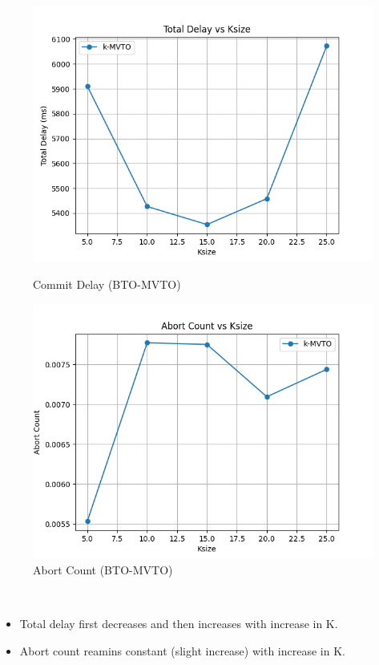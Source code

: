 \documentclass[12pt]{article}
\begin{document}
\begin{figure}[h]
    \centering
    \begin{minipage}[b]{0.45\textwidth}
        \includegraphics[width=\textwidth]{./images/KsizeTD.png}
        \caption{Commit Delay (BTO-MVTO)}
        \label{fig:KsizeTD}
    \end{minipage}
    \hfill
    \begin{minipage}[b]{0.45\textwidth}
        \includegraphics[width=\textwidth]{./images/KsizeAC.png}
        \caption{Abort Count (BTO-MVTO)}
        \label{fig:KsizeAC}
    \end{minipage}
\end{figure}\\
\begin{itemize}
    \item Total delay first decreases and then increases with increase in K.
    \item Abort count reamins constant (slight increase) with increase in K.
\end{itemize}
\end{document}
